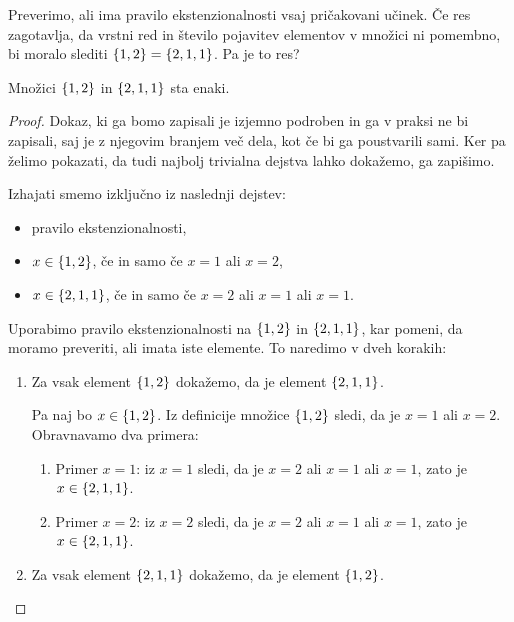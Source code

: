 Preverimo, ali ima pravilo ekstenzionalnosti vsaj pričakovani učinek.
%
Če res zagotavlja, da vrstni red in število pojavitev elementov v množici ni pomembno, bi moralo slediti
$\left\{1, 2\right\} = \left\{2, 1, 1\right\}$. Pa je to res?

\begin{trditev}
  Množici $\left\{1, 2\right\}$ in $\left\{2, 1, 1\right\}$ sta enaki.
\end{trditev}

\begin{proof}
  Dokaz, ki ga bomo zapisali je izjemno podroben in ga v praksi ne bi zapisali,
  saj je z njegovim branjem več dela, kot če bi ga poustvarili sami. Ker pa želimo pokazati, da
  tudi najbolj trivialna dejstva lahko dokažemo, ga zapišimo.

  Izhajati smemo izključno iz naslednji dejstev:
  \begin{itemize}
  \item pravilo ekstenzionalnosti,
  \item $x \in \left\{1, 2\right\}$, če in samo če $x = 1$ ali $x = 2$,
  \item $x \in \left\{2, 1, 1\right\}$, če in samo če $x = 2$ ali $x = 1$ ali $x = 1$.
  \end{itemize}
  Uporabimo pravilo ekstenzionalnosti na $\left\{1, 2\right\}$ in
  $\left\{2, 1, 1\right\}$, kar pomeni, da moramo preveriti, ali imata iste elemente. To
  naredimo v dveh korakih:
  \begin{enumerate}
  \item Za vsak element $\left\{1, 2\right\}$ dokažemo, da je element $\left\{2, 1, 1\right\}$.

    Pa naj bo $x \in \left\{1, 2\right\}$. Iz definicije množice $\left\{1, 2\right\}$
    sledi, da je $x = 1$ ali $x = 2$. Obravnavamo dva primera:
    \begin{enumerate}
    \item Primer $x = 1$: iz $x = 1$ sledi, da je $x = 2$ ali $x = 1$ ali $x = 1$, zato je $x \in \left\{2, 1, 1\right\}$.
    \item Primer $x = 2$: iz $x = 2$ sledi, da je $x = 2$ ali $x = 1$ ali $x = 1$, zato je $x \in \left\{2, 1, 1\right\}$.
    \end{enumerate}
  \item Za vsak element $\left\{2, 1, 1\right\}$ dokažemo, da je element $\left\{1, 2\right\}$.


\end{enumerate}
\end{proof}
